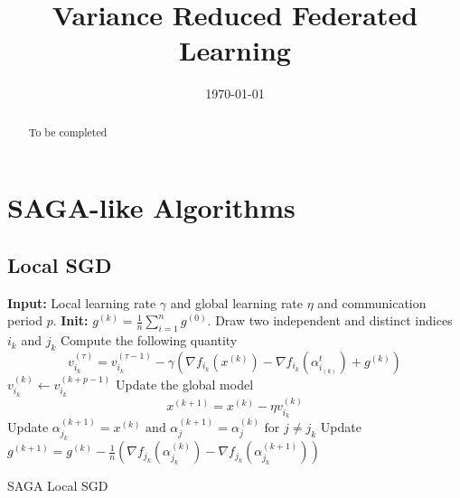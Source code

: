 \documentclass[11pt]{article}
\theoremstyle{t}
\begin{document}
\title{Variance Reduced Federated Learning}
\date{\today}

\maketitle

\begin{abstract}
To be completed
\end{abstract}


\section{SAGA-like Algorithms}

\subsection{Local SGD}
\begin{algorithm}[H]
\begin{algorithmic}[1]
\STATE \textbf{Input:} Local learning rate $\gamma$ and global learning rate $\eta$ and communication period $p$.
\STATE \textbf{Init:} $g^{(k)} = \frac{1}{n} \sum_{i=1}^n g^{(0)}$.
\STATE Draw two independent and distinct indices $i_k$ and $j_k$
\STATE Compute the following quantity
$$
v_{i_k}^{(\tau)}=v_{i_k}^{(\tau-1)} - \gamma( \nabla f_{i_{k}}\left(x^{(k)}\right)-\nabla f_{i_{k}}\left(\alpha_{i_{(k)}}^{t}\right)+g^{(k)})
$$
\ENDFOR
\STATE $v_{i_k}^{(k)} \leftarrow v_{i_k}^{(k+p-1)}$
\STATE Update the global model
$$
x^{(k+1)}=x^{(k)} - \eta v_{i_k}^{(k)}
$$
\STATE Update $\alpha_{j_{k}}^{(k+1)}=x^{(k)} \text { and } \alpha_{j}^{(k+1)}=\alpha_{j}^{(k)} \text { for } j \neq j_{k}$
\STATE Update $g^{(k+1)}=g^{(k)}-\frac{1}{n}\left(\nabla f_{j_{k}}\left(\alpha_{j_{k}}^{(k)}\right)-\nabla f_{j_{k}}\left(\alpha_{j_{k}}^{(k+1)}\right)\right)$
\ENDFOR
\end{algorithmic}
\caption{SAGA Local SGD}
\label{alg:miso}
        \end{algorithm}
\end{document}
